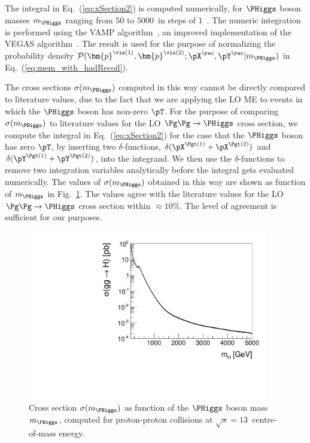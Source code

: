 The integral in Eq.~(\ref{eq:xSection2}) is computed numerically,
for $\PHiggs$ boson masses $m_{\PHiggs}$ ranging from $50$ to $5000$~\GeV in steps of $1$~\GeV.
The numeric integration is performed using the VAMP algorithm~\cite{VAMP},
an improved implementation of the VEGAS algorithm~\cite{VEGAS}.
The result is used for the purpose of normalizing the probability density $\mathcal{P}(\bm{p}^{\vis(1)},\bm{p}^{\vis(2)};\pX^{\rec},\pY^{\rec}|m_{\PHiggs})$
in Eq.~(\ref{eq:mem_with_hadRecoil}).

The cross sections $\sigma(m_{\PHiggs})$ computed in this way cannot 
be directly compared to literature values,
due to the fact that we are applying the LO ME to events in which the $\PHiggs$ boson has non-zero $\pT$.
For the purpose of comparing $\sigma(m_{\PHiggs})$ to literature
values for the LO $\Pg\Pg \to \PHiggs$ cross section,
we compute the integral in Eq.~(\ref{eq:xSection2}) for the case that the $\PHiggs$ boson has zero $\pT$,
by inserting two $\delta$-functions, $\delta(\pX^{\Pgt(1)} + \pX^{\Pgt(2)})$ and $\delta(\pY^{\Pgt(1)} + \pY^{\Pgt(2)})$, into the integrand.
We then use the $\delta$-functions to remove two integration variables analytically before the integral gets evaluated numerically.
The values of $\sigma(m_{\PHiggs})$ obtained in this way are shown as function of
$m_{\PHiggs}$ in Fig.~\ref{fig:xSection}.
The values agree with the literature values for the LO $\Pg\Pg \to
\PHiggs$ cross section within $\approx 10\%$. 
The level of agreement is sufficient for our purposes.

\begin{figure}
\begin{center}
\includegraphics*[height=74mm]{plots/makeSVfitMEM_xSectionPlot_log.pdf}
\end{center}
\caption{
  Cross section $\sigma(m_{\PHiggs})$ as function of the $\PHiggs$ boson mass $m_{\PHiggs}$,
  computed for proton-proton collisions at $\sqrt{s} = 13$~\TeV centre-of-mass energy.
}
\label{fig:xSection}
\end{figure}

